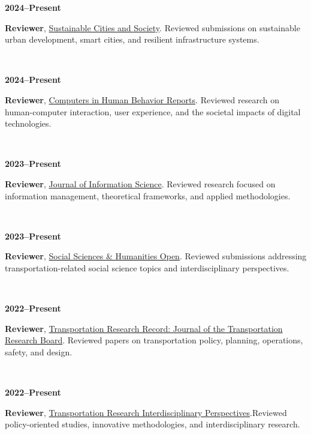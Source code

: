 \documentclass[a4paper,11pt]{article}
\begin{document}
\begin{justify}
\begin{flushleft}
\parbox[t]{2.5cm}{\textbf{2024--Present}}%
\hspace{0.1mm}%
\parbox[t]{\dimexpr\textwidth-2.5cm-0.1mm\relax}{%
\textbf{Reviewer}, \href{https://www.sciencedirect.com/journal/sustainable-cities-and-society}{Sustainable Cities and Society}. Reviewed submissions on sustainable urban development, smart cities, and resilient infrastructure systems.}\\[0.5em]

\parbox[t]{2.5cm}{\textbf{2024--Present}}%
\hspace{0.1mm}%
\parbox[t]{\dimexpr\textwidth-2.5cm-0.1mm\relax}{%
\textbf{Reviewer}, \href{https://www.sciencedirect.com/journal/computers-in-human-behavior-reports}{Computers in Human Behavior Reports}. Reviewed research on human-computer interaction, user experience, and the societal impacts of digital technologies.}\\[0.5em]

\parbox[t]{2.5cm}{\textbf{2023--Present}}%
\hspace{0.1mm}%
\parbox[t]{\dimexpr\textwidth-2.5cm-0.1mm\relax}{%
\textbf{Reviewer}, \href{https://journals.sagepub.com/home/jis}{Journal of Information Science}. Reviewed research focused on information management, theoretical frameworks, and applied methodologies.}\\[0.5em]

\parbox[t]{2.5cm}{\textbf{2023--Present}}%
\hspace{0.1mm}%
\parbox[t]{\dimexpr\textwidth-2.5cm-0.1mm\relax}{%
\textbf{Reviewer}, \href{https://www.sciencedirect.com/journal/social-sciences-and-humanities-open}{Social Sciences \& Humanities Open}. Reviewed submissions addressing transportation-related social science topics and interdisciplinary perspectives.}\\[0.5em]

\parbox[t]{2.5cm}{\textbf{2022--Present}}%
\hspace{0.1mm}%
\parbox[t]{\dimexpr\textwidth-2.5cm-0.1mm\relax}{%
\textbf{Reviewer}, \href{https://journals.sagepub.com/home/trr}{Transportation Research Record: Journal of the Transportation Research Board}. Reviewed papers on transportation policy, planning, operations, safety, and design.}\\[0.5em]

\parbox[t]{2.5cm}{\textbf{2022--Present}}%
\hspace{0.1mm}%
\parbox[t]{\dimexpr\textwidth-2.5cm-0.1mm\relax}{%
\textbf{Reviewer}, \href{https://www.sciencedirect.com/journal/transportation-research-interdisciplinary-perspectives}{Transportation Research Interdisciplinary Perspectives}.Reviewed policy-oriented studies, innovative methodologies, and interdisciplinary research.}\\[0.5em]


\end{flushleft}
\end{justify}
\end{document}
